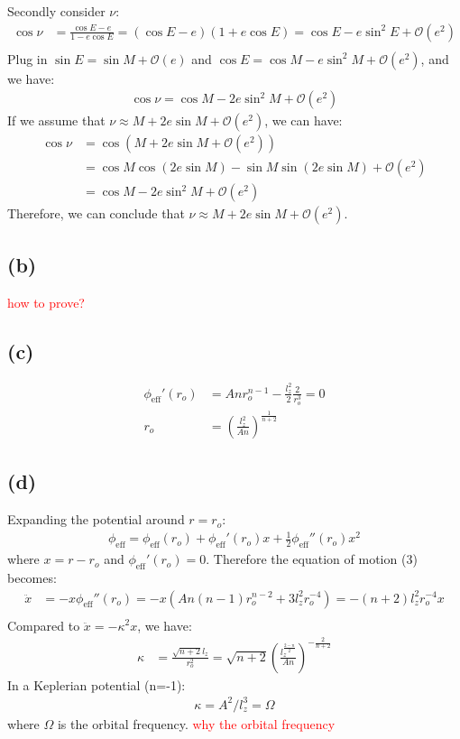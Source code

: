 \documentclass[a4paper,12pt]{article}
\begin{document}
Secondly consider $\nu$:
\begin{align*}
    \cos \nu &= \frac{\cos E - e}{1 - e\cos E}  = (\cos E - e)(1 + e\cos E) = \cos E - e \sin ^2E + \mathcal{O} (e^2)\\
\end{align*}
Plug in $\sin E = \sin M + \mathcal{O} (e)$ and $\cos E = \cos M - e\sin ^2M + \mathcal{O} (e^2)$, and we have:
\begin{align*}
    \cos \nu = \cos M - 2e \sin ^2M + \mathcal{O} (e^2)
\end{align*}
If we assume that $\nu \approx M + 2e\sin M + \mathcal{O} (e^2)$, we can have:
\begin{align*}
    \cos \nu &= \cos (M + 2e\sin M + \mathcal{O} (e^2)) \\
            &= \cos M \cos(2e\sin M) - \sin M \sin(2e\sin M) + \mathcal{O} (e^2) \\
            &= \cos M - 2 e\sin ^2M + \mathcal{O} (e^2)
\end{align*}
Therefore, we can conclude that $\nu \approx M + 2e\sin M + \mathcal{O} (e^2)$.

\subsection*{(b)}
\textcolor{red}{how to prove?}

\subsection*{(c)}
\begin{align*}
    \phi_{\text{eff}}'(r_o) &= An r_o^{n-1} - \frac{l_z^2}{2} \frac{2}{r_o^3} = 0 \\
    r_o &= (\frac{l_z^2}{An})^{\frac{1}{n+2}}
\end{align*}

\subsection*{(d)}
Expanding the potential around $r = r_o$:
\begin{align*}
    \phi_{\text{eff}} = \phi_{\text{eff}}(r_o) + \phi_{\text{eff}}'(r_o) x + \frac{1}{2} \phi_{\text{eff}}''(r_o) x^2
\end{align*}
where $x = r - r_o$ and $\phi_{\text{eff}}'(r_o)=0$.
Therefore the equation of motion (3) becomes:
\begin{align*}
    \ddot{x} &= - x \phi_{\text{eff}}''(r_o) = -x(An(n-1)r_o^{n-2} + 3 l_z^2 r_o^{-4}) = -(n+2)l_z^2 r_o^{-4} x \\
\end{align*}
Compared to $\ddot{x} = -\kappa^2 x$, we have:
\begin{align*}
    \kappa &= \frac{\sqrt{n+2} l_z}{r_o^2} = \sqrt{n+2} (\frac{l_z^{\frac{2-n}{2}}}{An})^{-\frac{2}{n+2}}
\end{align*}
In a Keplerian potential (n=-1):
\begin{align*}
    \kappa = A^2 / l_z^3 = \Omega
\end{align*}
where $\Omega$ is the orbital frequency.
\textcolor{red}{why the orbital frequency}
\end{document}
